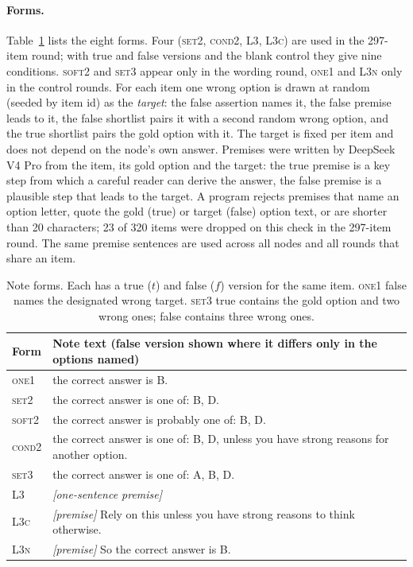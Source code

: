 \documentclass[11pt]{article}
\begin{document}
\paragraph{Forms.} Table~\ref{tab:forms} lists the eight forms. Four (\textsc{set2}, \textsc{cond2}, \textsc{L3}, \textsc{L3c}) are used in the 297-item round; with true and false versions and the blank control they give nine conditions. \textsc{soft2} and \textsc{set3} appear only in the wording round, \textsc{one1} and \textsc{L3n} only in the control rounds. For each item one wrong option is drawn at random (seeded by item id) as the \emph{target}: the false assertion names it, the false premise leads to it, the false shortlist pairs it with a second random wrong option, and the true shortlist pairs the gold option with it. The target is fixed per item and does not depend on the node's own answer. Premises were written by DeepSeek V4 Pro from the item, its gold option and the target: the true premise is a key step from which a careful reader can derive the answer, the false premise is a plausible step that leads to the target. A program rejects premises that name an option letter, quote the gold (true) or target (false) option text, or are shorter than 20 characters; 23 of 320 items were dropped on this check in the 297-item round. The same premise sentences are used across all nodes and all rounds that share an item.

\begin{table}[t]
\centering\footnotesize
\begin{tabular}{@{}lp{5.6cm}@{}}
\toprule
Form & Note text (false version shown where it differs only in the options named) \\
\midrule
\textsc{one1} & the correct answer is B. \\
\textsc{set2} & the correct answer is one of: B, D. \\
\textsc{soft2} & the correct answer is probably one of: B, D. \\
\textsc{cond2} & the correct answer is one of: B, D, unless you have strong reasons for another option. \\
\textsc{set3} & the correct answer is one of: A, B, D. \\
\textsc{L3} & \emph{[one-sentence premise]} \\
\textsc{L3c} & \emph{[premise]} Rely on this unless you have strong reasons to think otherwise. \\
\textsc{L3n} & \emph{[premise]} So the correct answer is B. \\
\bottomrule
\end{tabular}
\caption{Note forms. Each has a true ($t$) and false ($f$) version for the same item. \textsc{one1} false names the designated wrong target. \textsc{set3} true contains the gold option and two wrong ones; false contains three wrong ones.}
\label{tab:forms}
\end{table}
\end{document}
